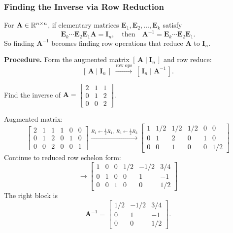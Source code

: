 \subsubsection{Finding the Inverse via Row Reduction}

For $\mathbf{A} \in \mathbb{R}^{n \times n}$, if elementary matrices $\mathbf{E}_1, \mathbf{E}_2, \ldots, \mathbf{E}_k$ satisfy
\[
  \mathbf{E}_k \cdots \mathbf{E}_2 \mathbf{E}_1 \mathbf{A} = \mathbf{I}_n,
  \quad\text{then}\quad
  \mathbf{A}^{-1} = \mathbf{E}_k \cdots \mathbf{E}_2 \mathbf{E}_1.
\]
So finding $\mathbf{A}^{-1}$ becomes finding row operations that reduce $\mathbf{A}$ to $\mathbf{I}_n$.

\textbf{Procedure.} Form the augmented matrix $[\,\mathbf{A} \mid \mathbf{I}_n\,]$ and row reduce:
\[
  [\,\mathbf{A} \mid \mathbf{I}_n\,]
  \;\xrightarrow{\text{row ops}}\;
  [\,\mathbf{I}_n \mid \mathbf{A}^{-1}\,].
\]

\begin{example}
  Find the inverse of $\mathbf{A} =
    \begin{bmatrix}
      2 & 1 & 1 \\ 0 & 1 & 2 \\ 0 & 0 & 2
    \end{bmatrix}
  $.

  Augmented matrix:
  \[
    \left[
      \begin{array}{ccc|ccc}
        2 & 1 & 1 & 1 & 0 & 0 \\
        0 & 1 & 2 & 0 & 1 & 0 \\
        0 & 0 & 2 & 0 & 0 & 1
      \end{array}
      \right]
    \xrightarrow{R_1 \leftarrow \frac{1}{2} R_1,\; R_3 \leftarrow \frac{1}{2} R_3}
    \left[
      \begin{array}{ccc|ccc}
        1 & 1/2 & 1/2 & 1/2 & 0 & 0   \\
        0 & 1   & 2   & 0   & 1 & 0   \\
        0 & 0   & 1   & 0   & 0 & 1/2
      \end{array}
      \right]
  \]
  Continue to reduced row echelon form:
  \[
    \longrightarrow
    \left[
      \begin{array}{ccc|ccc}
        1 & 0 & 0 & 1/2 & -1/2 & 3/4 \\
        0 & 1 & 0 & 0   & 1    & -1  \\
        0 & 0 & 1 & 0   & 0    & 1/2
      \end{array}
      \right]
  \]
  The right block is
  \[
    \mathbf{A}^{-1} =
    \begin{bmatrix}
      1/2 & -1/2 & 3/4 \\ 0 & 1 & -1 \\ 0 & 0 & 1/2
    \end{bmatrix}
    .
  \]
\end{example}

